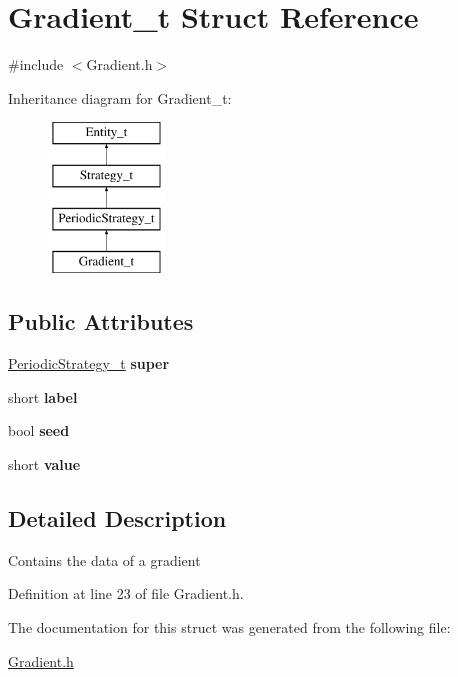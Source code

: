 \hypertarget{structGradient__t}{
\section{Gradient\_\-t Struct Reference}
\label{structGradient__t}
}


{\ttfamily \#include $<$Gradient.h$>$}

Inheritance diagram for Gradient\_\-t:\begin{figure}[H]
\begin{center}
\leavevmode
\includegraphics[height=4.000000cm]{structGradient__t}
\end{center}
\end{figure}
\subsection*{Public Attributes}
\begin{DoxyCompactItemize}
\item 
\hypertarget{structGradient__t_a56afa2a96c6aab698402985a0790ba77}{
\hyperlink{structPeriodicStrategy__t}{PeriodicStrategy\_\-t} {\bfseries super}}
\label{structGradient__t_a56afa2a96c6aab698402985a0790ba77}

\item 
\hypertarget{structGradient__t_a4475bc475afcc25dd1206e29d916d8f8}{
short {\bfseries label}}
\label{structGradient__t_a4475bc475afcc25dd1206e29d916d8f8}

\item 
\hypertarget{structGradient__t_a9b815c20de0daa2e7e696680bae36f4a}{
bool {\bfseries seed}}
\label{structGradient__t_a9b815c20de0daa2e7e696680bae36f4a}

\item 
\hypertarget{structGradient__t_a13a5569d3f1a74a76b2b4471770171db}{
short {\bfseries value}}
\label{structGradient__t_a13a5569d3f1a74a76b2b4471770171db}

\end{DoxyCompactItemize}


\subsection{Detailed Description}
Contains the data of a gradient 

Definition at line 23 of file Gradient.h.



The documentation for this struct was generated from the following file:\begin{DoxyCompactItemize}
\item 
\hyperlink{Gradient_8h}{Gradient.h}\end{DoxyCompactItemize}
